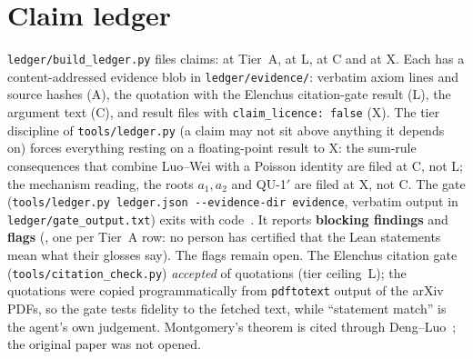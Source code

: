\documentclass[10pt]{article}
\begin{document}
\section{Claim ledger}\label{sec:ledger}
\texttt{ledger/build\_ledger.py} files \ZPLedgerN{} claims: \ZPLedgerA{} at Tier~A, \ZPLedgerL{} at L, \ZPLedgerC{} at C and \ZPLedgerX{} at X. Each has a content-addressed evidence blob in \texttt{ledger/evidence/}: verbatim axiom lines and source hashes (A), the quotation with the Elenchus citation-gate result (L),
the argument text (C), and result files with \texttt{claim\_licence: false} (X). The tier discipline of \texttt{tools/ledger.py} (a claim may not sit above anything it depends on) forces everything resting on a floating-point result to X:
the sum-rule consequences that combine Luo--Wei with a Poisson identity are filed at C, not L; the mechanism reading, the roots $a_1,a_2$ and QU-1$'$ are filed at X, not C. The gate
(\texttt{tools/ledger.py ledger.json -{}-evidence-dir evidence}, verbatim output in \texttt{ledger/gate\_output.txt}) exits with code~\ZPGateExit. It reports \textbf{\ZPGateBlock{} blocking findings} and \textbf{\ZPGateFlag{} flags}
(\ZPGateFlagKinds, one per Tier~A row: no person has certified that the Lean statements mean what their glosses say). The flags remain open. The Elenchus citation gate (\texttt{tools/citation\_check.py}) \emph{accepted} \ZPCitationAccepted{} of \ZPCitationN{} quotations (tier ceiling~L);
the quotations were copied programmatically from \texttt{pdftotext} output of the arXiv PDFs, so the gate tests fidelity to the fetched text, while ``statement match'' is the agent's own judgement. Montgomery's theorem is cited through Deng--Luo~\cite{dengluo}; the original paper was not opened.

\end{document}
